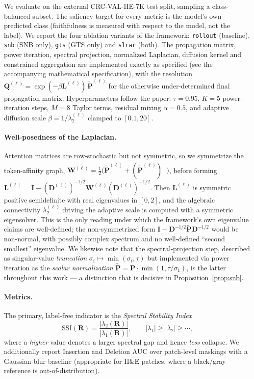 \documentclass[11pt]{article}
\newcommand{\D}{\mathbf{D}}
\newcommand{\W}{\mathbf{W}}
\newcommand{\I}{\mathbf{I}}
\newcommand{\Lap}{\mathbf{L}}
\newcommand{\Pm}{\mathbf{P}}
\newcommand{\Pt}{\tilde{\mathbf{P}}}
\newcommand{\Q}{\mathbf{Q}}
\newcommand{\R}{\mathbf{R}}
\newcommand{\SSI}{\mathrm{SSI}}
\begin{document}
We evaluate on the external CRC-VAL-HE-7K test split, sampling a
class-balanced subset. The saliency target for every metric is the
model's own predicted class (faithfulness is measured with respect to the
model, not the label). We report the four ablation variants of the framework:
\texttt{rollout} (baseline), \texttt{snb} (SNB only), \texttt{gts} (GTS only)
and \texttt{slrar} (both). The propagation matrix, power iteration, spectral
projection, normalized Laplacian, diffusion kernel and constrained aggregation
are implemented exactly as specified (see the accompanying mathematical
specification), with the resolution $\Q^{(\ell)}=\exp(-\beta\Lap^{(\ell)})\,\Pt^{(\ell)}$
for the otherwise under-determined final propagation matrix. Hyperparameters
follow the paper: $\tau=0.95$, $K=5$ power-iteration steps, $M=8$ Taylor terms,
residual mixing $\alpha=0.5$, and adaptive diffusion scale
$\beta=1/\lambda_2^{(\ell)}$ clamped to $[0.1,20]$.

\paragraph{Well-posedness of the Laplacian.} Attention matrices are
row-stochastic but not symmetric, so we symmetrize the token-affinity graph,
$\W^{(\ell)}=\tfrac12\big(\Pt^{(\ell)}+(\Pt^{(\ell)})^{\!\top}\big)$, before
forming $\Lap^{(\ell)}=\I-(\D^{(\ell)})^{-1/2}\W^{(\ell)}(\D^{(\ell)})^{-1/2}$.
Then $\Lap^{(\ell)}$ is symmetric positive semidefinite with real eigenvalues in
$[0,2]$, and the algebraic connectivity $\lambda_2^{(\ell)}$ driving the adaptive
scale is computed with a symmetric eigensolver. This is the only reading under
which the framework's own eigenvalue claims are well-defined; the
non-symmetrized form $\I-\D^{-1/2}\Pt\D^{-1/2}$ would be non-normal, with
possibly complex spectrum and no well-defined ``second smallest'' eigenvalue.
We likewise note that the spectral-projection step, described as singular-value
\emph{truncation} $\sigma_i\mapsto\min(\sigma_i,\tau)$ but implemented via power
iteration as the \emph{scalar normalization} $\Pt=\Pm\cdot\min(1,\tau/\sigma_1)$,
is the latter throughout this work --- a distinction that is decisive in
Proposition~\ref{prop:snb}.

\paragraph{Metrics.} The primary, label-free indicator is the
\emph{Spectral Stability Index}
\begin{equation}
\SSI(\R)=\frac{|\lambda_2(\R)|}{|\lambda_1(\R)|},\qquad
|\lambda_1|\ge|\lambda_2|\ge\cdots,
\label{eq:ssi}
\end{equation}
where a \emph{higher} value denotes a larger spectral gap and hence
\emph{less} collapse. We additionally report Insertion and Deletion AUC over
patch-level maskings with a Gaussian-blur baseline (appropriate for H\&E
patches, where a black/gray reference is out-of-distribution).
\end{document}
